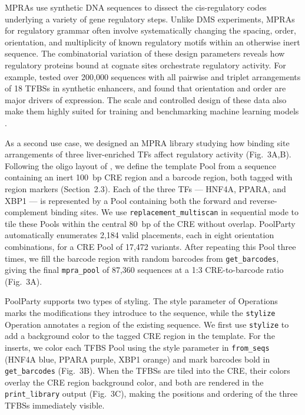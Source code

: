 \documentclass[unnumsec,webpdf,modern,large]{mam-authoring-template}%
\theoremstyle{thmstyleone}%
\theoremstyle{thmstyletwo}%
\theoremstyle{thmstylethree}%
\begin{document}
MPRAs use synthetic DNA sequences to dissect the cis-regulatory codes underlying a variety of gene regulatory steps. Unlike DMS experiments, MPRAs for regulatory grammar often involve systematically changing the spacing, order, orientation, and multiplicity of known regulatory motifs within an otherwise inert sequence. The combinatorial variation of these design parameters reveals how regulatory proteins bound at cognate sites orchestrate regulatory activity. For example, \citet{GeorgakopoulosSoares2023tf} tested over 200{,}000 sequences with all pairwise and triplet arrangements of 18 TFBSs in synthetic enhancers, and found that orientation and order are major drivers of expression. The scale and controlled design of these data also make them highly suited for training and benchmarking machine learning models \citep{Fleur2024decoding}.

As a second use case, we designed an MPRA library studying how binding site arrangements of three liver-enriched TFs affect regulatory activity (Fig.~3A,B). Following the oligo layout of \citet{Melnikov2012dw}, we define the template Pool from a sequence containing an inert 100~bp CRE region and a barcode region, both tagged with region markers (Section~2.3). Each of the three TFs --- HNF4A, PPARA, and XBP1 --- is represented by a Pool containing both the forward and reverse-complement binding sites. We use \texttt{replacement\_multiscan} in sequential mode to tile these Pools within the central 80~bp of the CRE without overlap. PoolParty automatically enumerates 2{,}184 valid placements, each in eight orientation combinations, for a CRE Pool of 17{,}472 variants. After repeating this Pool three times, we fill the barcode region with random barcodes from \texttt{get\_barcodes}, giving the final \texttt{mpra\_pool} of 87{,}360 sequences at a 1:3 CRE-to-barcode ratio (Fig.~3A). 

PoolParty supports two types of styling. The style parameter of Operations marks the modifications they introduce to the sequence, while the \texttt{stylize} Operation annotates a region of the existing sequence. We first use \texttt{stylize} to add a background color to the tagged CRE region in the template. For the inserts, we color each TFBS Pool using the style parameter in \texttt{from\_seqs} (HNF4A blue, PPARA purple, XBP1 orange) and mark barcodes bold in \texttt{get\_barcodes} (Fig.~3B). When the TFBSs are tiled into the CRE, their colors overlay the CRE region background color, and both are rendered in the \texttt{print\_library} output (Fig.~3C), making the positions and ordering of the three TFBSs immediately visible.
\end{document}
